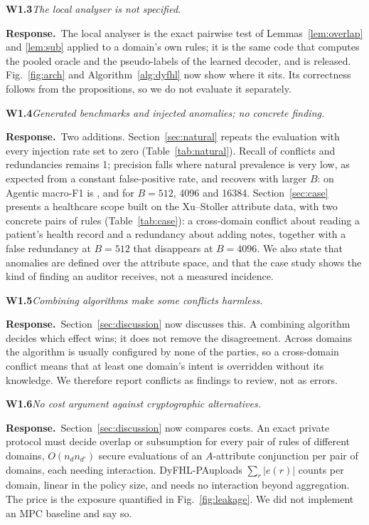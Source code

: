 \documentclass[11pt,a4paper]{article}
\newcommand{\name}{DyFHL-PA}
\newcommand{\concern}[2]{\medskip\noindent\textbf{#1}\quad\emph{#2}\par\smallskip}
\newcommand{\resp}{\noindent\textcolor{blue!55!black}{\textbf{Response.}}\ }
\begin{document}
\concern{W1.3}{The local analyser is not specified.}
\resp The local analyser is the exact pairwise test of Lemmas~\ref{lem:overlap} and \ref{lem:sub} applied to a domain's own rules; it is the same code that computes the pooled oracle and the pseudo-labels of the learned decoder, and is released. Fig.~\ref{fig:arch} and Algorithm~\ref{alg:dyfhl} now show where it sits. Its correctness follows from the propositions, so we do not evaluate it separately.

\concern{W1.4}{Generated benchmarks and injected anomalies; no concrete finding.}
\resp Two additions. Section~\ref{sec:natural} repeats the evaluation with every injection rate set to zero (Table~\ref{tab:natural}). Recall of conflicts and redundancies remains 1; precision falls where natural prevalence is very low, as expected from a constant false-positive rate, and recovers with larger $B$: on Agentic macro-F1 is \natagenticBdxii{}, \natagenticBmmmmxcvi{} and \natagenticBsixteenk{} for $B=512$, 4096 and 16384. Section~\ref{sec:case} presents a healthcare scope built on the Xu--Stoller attribute data, with two concrete pairs of rules (Table~\ref{tab:case}): a cross-domain conflict about reading a patient's health record and a redundancy about adding notes, together with a false redundancy at $B=512$ that disappears at $B=4096$. We also state that anomalies are defined over the attribute space, and that the case study shows the kind of finding an auditor receives, not a measured incidence.

\concern{W1.5}{Combining algorithms make some conflicts harmless.}
\resp Section~\ref{sec:discussion} now discusses this. A combining algorithm decides which effect wins; it does not remove the disagreement. Across domains the algorithm is usually configured by none of the parties, so a cross-domain conflict means that at least one domain's intent is overridden without its knowledge. We therefore report conflicts as findings to review, not as errors.

\concern{W1.6}{No cost argument against cryptographic alternatives.}
\resp Section~\ref{sec:discussion} now compares costs. An exact private protocol must decide overlap or subsumption for every pair of rules of different domains, $O(n_d n_{d'})$ secure evaluations of an $A$-attribute conjunction per pair of domains, each needing interaction. \name uploads $\sum_r|e(r)|$ counts per domain, linear in the policy size, and needs no interaction beyond aggregation. The price is the exposure quantified in Fig.~\ref{fig:leakage}. We did not implement an MPC baseline and say so.
\end{document}
